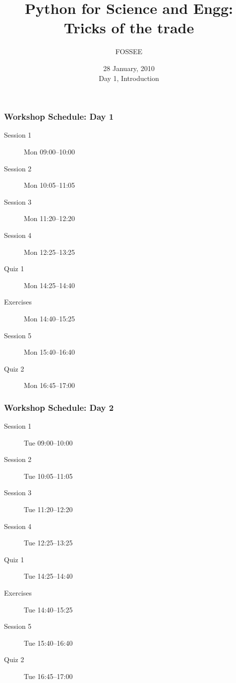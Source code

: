 \documentclass[14pt,compress]{beamer}
\title[Tricks of the trade]{Python for Science and Engg: Tricks of the trade}
\author[FOSSEE] {FOSSEE}
\institute[IIT Bombay] {Department of Aerospace Engineering\\IIT Bombay}
\date[] {28 January, 2010\\Day 1, Introduction}
\begin{document}
\begin{frame}
  \maketitle
\end{frame}


\begin{frame}
  \frametitle{Workshop Schedule: Day 1}
  \begin{description}
	\item[Session 1] Mon 09:00--10:00
	\item[Session 2] Mon 10:05--11:05
	\item[Session 3] Mon 11:20--12:20
	\item[Session 4] Mon 12:25--13:25
        \item[Quiz 1] Mon 14:25--14:40
        \item[Exercises] Mon 14:40--15:25
        \item[Session 5] Mon 15:40--16:40
        \item[Quiz 2] Mon 16:45--17:00
  \end{description}
\end{frame}

\begin{frame}
  \frametitle{Workshop Schedule: Day 2}
  \begin{description}
	\item[Session 1] Tue 09:00--10:00
	\item[Session 2] Tue 10:05--11:05
	\item[Session 3] Tue 11:20--12:20
	\item[Session 4] Tue 12:25--13:25
        \item[Quiz 1]  Tue 14:25--14:40
        \item[Exercises] Tue 14:40--15:25
        \item[Session 5] Tue 15:40--16:40
        \item[Quiz 2]  Tue 16:45--17:00
  \end{description}
\end{frame}
\end{document}

